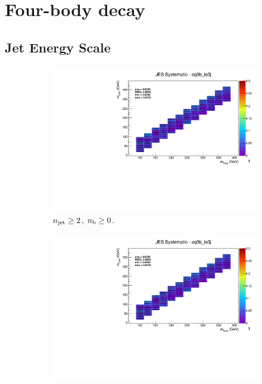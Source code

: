 \clearpage
\section*{Four-body decay}
\label{sec:t2degen_syst_plots}

\newpage
\subsection*{Jet Energy Scale}
\label{sec:t2degen_jes_plots}

\begin{figure}[ht!]
  \centering
  \begin{subfigure}[b]{0.32\textwidth}
    \includegraphics[width=\textwidth, page=14]{Figs/sms/t2degen/v19_3/systs/T2_4body_JES_eq0b_le3j.pdf}
    \caption{$n_{\text{jet}} \geq 2$, $n_{\text{b}} \geq 0$.}
  \end{subfigure}
  \begin{subfigure}[b]{0.32\textwidth}
    \includegraphics[width=\textwidth, page=9]{Figs/sms/t2degen/v19_3/systs/T2_4body_JES_eq0b_le3j.pdf}

\end{subfigure}
\end{figure}
